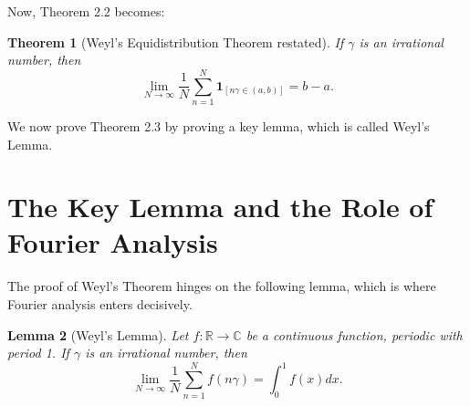 \documentclass[12pt]{article}
\newtheorem{theorem}{Theorem}[section]
\newtheorem{lemma}[theorem]{Lemma}
\newcommand{\R}{\mathbb{R}}
\newcommand{\C}{\mathbb{C}}
\begin{document}
Now, Theorem 2.2 becomes:

\begin{theorem}[Weyl's Equidistribution Theorem restated]
If $\gamma$ is an irrational number, then $$ \lim_{N\to\infty} \frac{1}{N} \sum_{n=1}^N \mathbf{1}_{[n\gamma \in (a,b)]} = b-a. $$
\end{theorem}

We now prove Theorem 2.3 by proving a key lemma, which is called Weyl's Lemma.

\section{The Key Lemma and the Role of Fourier Analysis}

The proof of Weyl's Theorem hinges on the following lemma, which is where Fourier analysis enters decisively.

\begin{lemma}[Weyl's Lemma]
Let $f: \R \to \C$ be a continuous function, periodic with period 1. If $\gamma$ is an irrational number, then
$$ \lim_{N\to\infty} \frac{1}{N} \sum_{n=1}^N f(n\gamma) = \int_0^1 f(x) dx. $$
\end{lemma}
\end{document}
